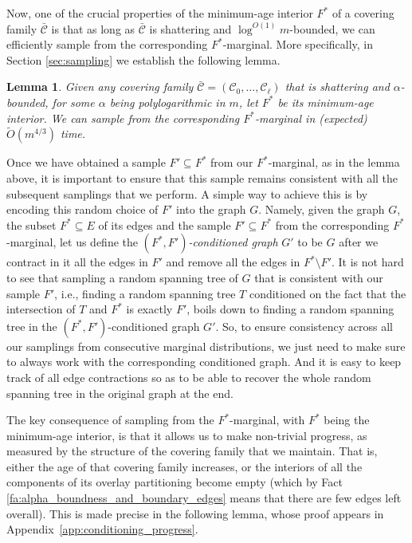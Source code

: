 \documentclass[11pt, letterpaper]{article}
\newtheorem{lemma}[theorem]{Lemma}
\newcommand{\cC}{\mathcal{C}}
\newcommand{\ocC}{\bar{\mathcal{C}}}
\newcommand{\tO}{\widetilde{O}}
\begin{document}
Now, one of the crucial properties of the minimum-age interior $F^*$ of a covering family $\ocC$ is that as long as $\ocC$ is shattering and $\log^{O(1)}m$-bounded, we can efficiently sample from the corresponding $F^*$-marginal. More specifically, in Section \ref{sec:sampling} we establish the following lemma.


\begin{lemma}
\label{lem:conditioning_main}
Given any covering family $\ocC=(\cC_0,\ldots, \cC_{\ell})$ that is shattering and $\alpha$-bounded, for some $\alpha$ being polylogarithmic in $m$, let $F^*$ be its minimum-age interior. We can sample from the corresponding $F^*$-marginal in (expected) $\tO(m^{4/3})$ time.
\end{lemma}

Once we have obtained a sample $F'\subseteq F^*$ from our $F^*$-marginal, as in the lemma above, it is important to ensure that this sample remains consistent with all the subsequent samplings that we perform. A simple way to achieve this is by encoding this random choice of $F'$ into the graph $G$. Namely, given the graph $G$, the subset $F^*\subseteq E$ of its edges and the sample $F'\subseteq F^*$ from the corresponding $F^*$-marginal, let us define the {\em $(F^*,F')$-conditioned graph} $G'$ to be $G$ after we contract in it all the edges in $F'$ and remove all the edges in $F^*\setminus F'$. It is not hard to see that sampling a random spanning tree of $G$ that is consistent with our sample $F'$, i.e., finding a random spanning tree $T$ conditioned on the fact that the intersection of $T$ and $F^*$ is exactly $F'$, boils down to finding a random spanning tree in the $(F^*,F')$-conditioned graph $G'$. So, to ensure consistency across all our samplings from consecutive marginal distributions, we just need to make sure to always work with the corresponding conditioned graph. And it is easy to keep track of all edge contractions so as to be able to recover the whole random spanning tree in the original graph at the end.

The key consequence of sampling from the $F^*$-marginal, with $F^*$ being the minimum-age interior, is that it allows us to make non-trivial progress, as measured by the structure of the covering family that we maintain. That is, either the age of that covering family increases, or the interiors of all the components of its overlay partitioning become empty (which by Fact \ref{fa:alpha_boundness_and_boundary_edges} means that there are few edges left overall). This is made precise in the following lemma, whose proof appears in Appendix~\ref{app:conditioning_progress}.
\end{document}
